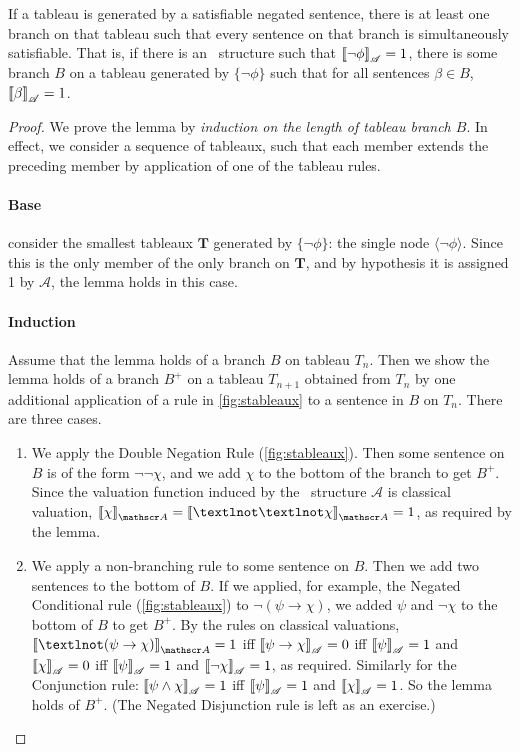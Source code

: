 \begin{lemma}\label{lemma1} If a tableau is generated by a satisfiable negated sentence, there is at least one branch on that tableau such that every sentence on that branch is simultaneously satisfiable. That is, if there is an \lone\ structure such that $\left\llbracket \neg \phi\right\rrbracket_{\mathscr{A}} =1$, there is some branch $B$ on a tableau generated by $\{\neg\phi\}$ such that for all sentences $\beta \in B$, $\left\llbracket \beta\right\rrbracket_{\mathscr{A}} = 1$.\end{lemma}
\begin{proof} We prove the lemma by {\em induction on the length of tableau branch $B$}. In effect, we consider a sequence of tableaux, such that each member extends the preceding member by application of one of the tableau rules.
    
   \paragraph{Base} consider the smallest tableaux $\mathbf{T}$ generated by $\{\neg\phi\}$: 
    the single node $\langle\neg\phi\rangle$. Since this is the only
    member of the only branch on $\mathbf{T}$, and by hypothesis it is assigned 1 by $\mathscr{A}$, the lemma holds in this case.
    
 \paragraph{Induction} Assume that the lemma holds of a branch 
 $B$ on tableau $T_{n}$. Then we show the lemma holds of a branch $B^{+}$ on a tableau $T_{n+1}$ obtained from
    $T_{n}$ by one additional application of a rule in
    \autoref{fig:stableaux} to a sentence in $B$ on $T_{n}$. There are
    three cases.
    \begin{enumerate}
	\item We apply the Double Negation Rule (\autoref{fig:stableaux}).
	Then some sentence on $B$ is of the form $\neg\neg\chi$, and we add
	$\chi$ to the bottom of the branch to get $B^{+}$. Since the valuation function induced by the \lone\ structure $\mathscr{A}$ is classical valuation, $\val{\chi}{A} = \val{¬¬\chi}{A} = 1$, as required by the lemma.
	\item We apply a non-branching rule to some sentence  on $B$. Then we add two sentences to
	the bottom of $B$. If we applied, for example, the Negated
	Conditional rule (\autoref{fig:stableaux}) to $\neg(\psi \to \chi)$, we added $\psi$ and
	$\neg\chi$ to the bottom of $B$ to get $B^{+}$. By the rules on classical valuations, $\val{¬(\psi\to\chi)}{A} = 1$ iff $\left\llbracket \psi \to \chi\right\rrbracket_{\mathscr{A}} = 0$ iff $\left\llbracket \psi\right\rrbracket_{\mathscr{A}} = 1$ and $\left\llbracket \chi\right\rrbracket_{\mathscr{A}} = 0$ iff $\left\llbracket \psi\right\rrbracket_{\mathscr{A}} = 1$ and
	$\left\llbracket \neg\chi\right\rrbracket_{\mathscr{A}} = 1$, as required. Similarly for the
 Conjunction rule: $\left\llbracket \psi\wedge\chi\right\rrbracket_{\mathscr{A}} = 1$ iff $\left\llbracket \psi\right\rrbracket_{\mathscr{A}} = 1$ and
	$\left\llbracket \chi\right\rrbracket_{\mathscr{A}} = 1$. So the lemma holds of $B^{+}$. (The Negated Disjunction rule is left as an exercise.)


\end{enumerate}
\end{proof}
